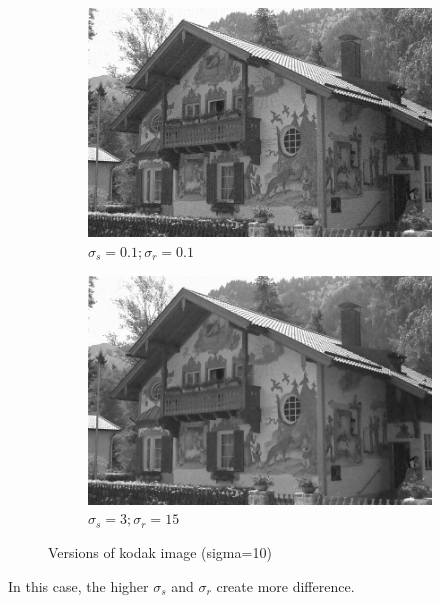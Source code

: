 \documentclass[12pt]{article}
\begin{document}
\begin{figure}[h]
    \begin{subfigure}[b]{0.24\textwidth}
        \centering
        \includegraphics[width=\textwidth]{../images/filtered_kodak_10_sigma_s_0.1_sigma_r_0.1.png}
        \caption{$\sigma_s=0.1;\sigma_r=0.1$}
        \label{fig:subfig3}
    \end{subfigure}
    \begin{subfigure}[b]{0.24\textwidth}
        \centering
        \includegraphics[width=\textwidth]{../images/filtered_kodak_10_sigma_s_3_sigma_r_15.png}
        \caption{$\sigma_s=3;\sigma_r=15$}
        \label{fig:subfig3}
    \end{subfigure}
    
    \caption{Versions of kodak image (sigma=10)}
    \label{fig:overall}
\end{figure}


In this case, the higher $\sigma_s$ and $\sigma_r$ create more difference.
\end{document}
